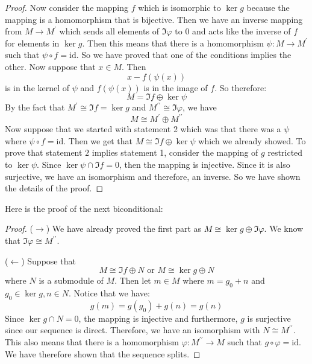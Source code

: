 \documentclass{article}
\begin{document}
\begin{itemize}
\begin{proof}
        Now consider the mapping $f$ which is isomorphic to $\ker{g}$ because the mapping is a homomorphism that is bijective. Then we have an inverse mapping from $M \rightarrow M^{\prime}$ which sends all elements of $\Im{\varphi}$ to $0$ and acts like the inverse of $f$ for elements in $\ker{g}$. Then this means that there is a homomorphism $\psi : M \rightarrow M^{\prime}$ such that $\psi \circ f = \text{id}$. So we have proved that one of the conditions implies the other. Now suppose that $x \in M$. Then
            \begin{equation*}
                x - f(\psi(x))
            \end{equation*}
        is in the kernel of $\psi$ and $f(\psi(x))$ is in the image of $f$. So therefore:
            \begin{equation*}
                M = \Im{f} \oplus \ker{\psi}
            \end{equation*}
        By the fact that $M^{\prime} \cong \Im{f} = \ker{g}$ and $M^{\prime\prime} \cong \Im{\varphi}$, we have
            \begin{equation*}
                M \cong M^{\prime} \oplus M^{\prime\prime}
            \end{equation*}
        Now suppose that we started with statement 2 which was that there was a $\psi$ where $\psi \circ f = \text{id}$. Then we get that $M \cong \Im{f} \oplus \ker{\psi}$ which we already showed. To prove that statement $2$ implies statement 1, consider the mapping of $g$ restricted to $\ker{\psi}$. Since $\ker{\psi} \cap \Im{f} = 0$, then the mapping is injective. Since it is also surjective, we have an isomorphism and therefore, an inverse. So we have shown the details of the proof.
    \end{proof}
Here is the proof of the next biconditional:
    \begin{proof}
        ($\rightarrow $) We have already proved the first part as $M \cong \ker{g} \oplus \Im{\varphi}$. We know that $\Im{\varphi} \cong M^{\prime\prime}$.

        ($\leftarrow $) Suppose that 
            \begin{equation*}
                M \cong \Im{f} \oplus N \text{ or } M \cong \ker{g} \oplus N
            \end{equation*}
        where $N$ is a submodule of $M$. Then let $m \in M$ where $m = g_{0} + n$ and $g_{0} \in \ker{g}, n \in N$. Notice that we have:
            \begin{equation*}
                g(m) = g(g_{0}) + g(n) = g(n)
            \end{equation*}
        Since $\ker{g} \cap N = 0$, the mapping is injective and furthermore, $g$ is surjective since our sequence is direct. Therefore, we have an isomorphism with $N \cong M^{\prime\prime}$. This also means that there is a homomorphism $\varphi : M^{\prime\prime} \rightarrow M$ such that $g \circ \varphi = \text{id}$. We have therefore shown that the sequence splits.
    \end{proof}


\end{itemize}
\end{document}
